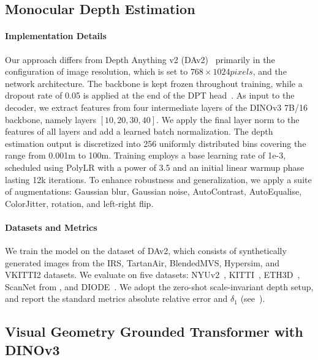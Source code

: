 \subsection{Monocular Depth Estimation}
\label{app:exp-details:depth-system}

\paragraph{Implementation Details}
Our approach differs from Depth Anything v2 (DAv2)~\citep{yang2024depthanythingv2} primarily in the configuration of image resolution, which is set to $768 \times 1024 pixels$, and the network architecture. 
The backbone is kept frozen throughout training, while a dropout rate of 0.05 is applied at the end of the DPT head~\citep{ranftl2021vision}. 
As input to the decoder, we extract features from four intermediate layers of the DINOv3 7B/16 backbone, namely layers \([10, 20, 30, 40]\).
We apply the final layer norm to the features of all layers and add a learned batch normalization.
The depth estimation output is discretized into 256 uniformly distributed bins covering the range from 0.001m to 100m. 
Training employs a base learning rate of 1e-3, scheduled using PolyLR with a power of 3.5 and an initial linear warmup phase lasting 12k iterations. 
To enhance robustness and generalization, we apply a suite of augmentations: Gaussian blur, Gaussian noise, AutoContrast, AutoEqualise, ColorJitter, rotation, and left-right flip.

\paragraph{Datasets and Metrics}
We train the model on the dataset of DAv2, which consists of synthetically generated images from the IRS, TartanAir, BlendedMVS, Hypersim, and VKITTI2 datasets.
We evaluate on five datasets: NYUv2~\citep{silberman2012indoor}, KITTI~\citep{geiger2013vision}, ETH3D~\citep{schoeps2017multiview}, ScanNet from \citep{ke2025marigold}, and DIODE~\citep{vasiljevic2019diode}.
We adopt the zero-shot scale-invariant depth setup, and report the standard metrics absolute relative error and $\delta_1$ (see~\citep{yang2024depthanythingv1}).

\subsection{Visual Geometry Grounded Transformer with DINOv3}
\label{app:exp-details:vggt}

